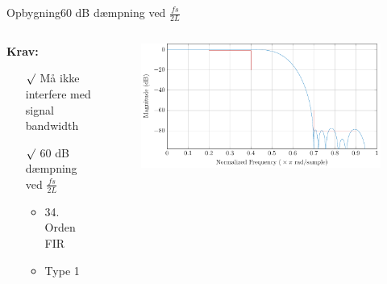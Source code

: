 \begin{frame}{Opbygning}{60 dB dæmpning ved $\frac{fs}{2L}$}
\begin{columns}
  \begin{column}{0.4\textwidth}
\textbf{Krav:}
\begin{itemize}
\item[$\surd$] Må ikke interfere med signal bandwidth
\item[$\surd$] \alert{60 dB dæmpning ved $\frac{fs}{2L}$}
\begin{itemize}
\item 34. Orden FIR
\item Type 1
\end{itemize}
\end{itemize}
  \end{column}
  \begin{column}{0.6\textwidth}
\begin{figure}
	\centering
	\includegraphics[width=1\textwidth]{IntMag}
\end{figure}
  \end{column}
\end{columns}
\end{frame}


